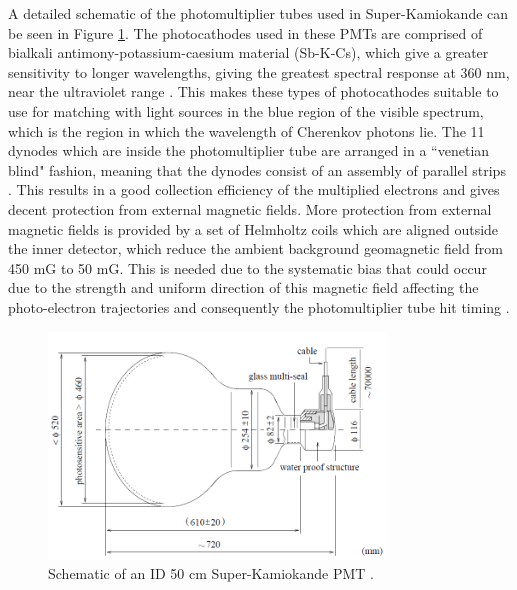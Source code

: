 A detailed schematic of the photomultiplier tubes used in Super-Kamiokande can be seen in Figure \ref{fig:PMTdiagram}. The photocathodes used in these PMTs are comprised of bialkali antimony-potassium-caesium material (Sb-K-Cs), which give a greater sensitivity to longer wavelengths, giving the greatest spectral response at 360 nm, near the ultraviolet range \cite{vukolov2015portable}. This makes these types of photocathodes suitable to use for matching with light sources in the blue region of the visible spectrum, which is the region in which the wavelength of Cherenkov photons lie. The 11 dynodes which are inside the photomultiplier tube are arranged in a ``venetian blind" fashion, meaning that the dynodes consist of an assembly of parallel strips \cite{van1972experimental}. This results in a good collection efficiency of the multiplied electrons and gives decent protection from external magnetic fields. More protection from external magnetic fields is provided by a set of Helmholtz coils which are aligned outside the inner detector, which reduce the ambient background geomagnetic field from 450 mG to 50 mG. This is needed due to the systematic bias that could occur due to the strength and uniform direction of this magnetic field affecting the photo-electron trajectories and consequently the photomultiplier tube hit timing \cite{brack2013characterization}. 

\begin{figure}
    \centering
    \includegraphics[width=0.8\textwidth]{Figures/PMT_schematic.png}
\caption{Schematic of an ID 50 cm Super-Kamiokande PMT \cite{fukuda_super-kamiokande_2003}.}
    \label{fig:PMTdiagram}
\end{figure}



